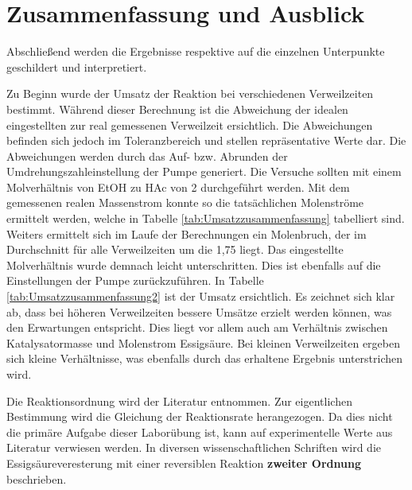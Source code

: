 \documentclass[12pt,liststotoc]{report}
\begin{document}
\chapter{Zusammenfassung und Ausblick}
Abschließend werden die Ergebnisse respektive auf die einzelnen Unterpunkte geschildert und interpretiert. \newline

Zu Beginn wurde der Umsatz der Reaktion bei verschiedenen Verweilzeiten bestimmt. Während dieser Berechnung ist die Abweichung der idealen eingestellten zur real gemessenen Verweilzeit ersichtlich. Die Abweichungen befinden sich jedoch  im Toleranzbereich und stellen repräsentative Werte dar. Die Abweichungen werden durch das Auf- bzw. Abrunden der Umdrehungszahleinstellung der Pumpe generiert. \newline
Die Versuche sollten mit einem Molverhältnis von EtOH zu HAc von 2 durchgeführt werden. Mit dem gemessenen realen Massenstrom konnte so die tatsächlichen Molenströme ermittelt werden, welche in Tabelle \ref{tab:Umsatzzusammenfassung} tabelliert sind. Weiters ermittelt sich im Laufe der Berechnungen ein Molenbruch, der im Durchschnitt für alle Verweilzeiten um die 1,75 liegt. Das eingestellte Molverhältnis wurde demnach leicht unterschritten. Dies ist ebenfalls auf die Einstellungen der Pumpe zurückzuführen. \newline
In Tabelle \ref{tab:Umsatzzusammenfassung2} ist der Umsatz ersichtlich. Es zeichnet sich klar ab, dass bei höheren Verweilzeiten bessere Umsätze erzielt werden können, was den Erwartungen entspricht. Dies liegt vor allem auch am Verhältnis zwischen Katalysatormasse und Molenstrom Essigsäure. Bei kleinen Verweilzeiten ergeben sich kleine Verhältnisse, was ebenfalls durch das erhaltene Ergebnis unterstrichen wird.\newline

Die Reaktionsordnung wird der Literatur entnommen. Zur eigentlichen Bestimmung wird die Gleichung der Reaktionsrate herangezogen. Da dies nicht die primäre Aufgabe dieser Laborübung ist, kann auf experimentelle Werte aus Literatur verwiesen werden. In diversen wissenschaftlichen Schriften wird die Essigsäureveresterung mit einer reversiblen Reaktion \textbf{zweiter Ordnung} beschrieben.\newline
\end{document}
